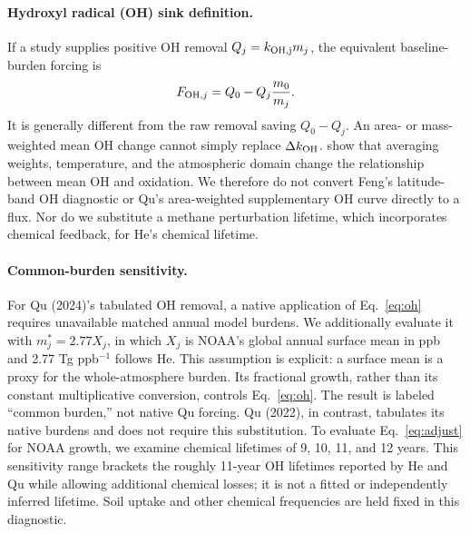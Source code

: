 \documentclass[11pt]{article}
\begin{document}
\paragraph{Hydroxyl radical (OH) sink definition.}
If a study supplies positive OH removal $Q_j=k_{\rm OH,j}m_j$, the equivalent
baseline-burden forcing is
\begin{equation}\label{eq:oh}
F_{{\rm OH},j}=Q_0-Q_j\frac{m_0}{m_j}.
\end{equation}
It is generally different from the raw removal saving $Q_0-Q_j$.
An area- or mass-weighted mean OH change cannot simply replace
$\Delta k_{\rm OH}$. \citet{lawrenceetal2001} show that averaging weights,
temperature, and the atmospheric domain change the relationship between mean
OH and oxidation. We therefore do not convert Feng's latitude-band OH
diagnostic or Qu's area-weighted supplementary OH curve directly to a flux.
Nor do we substitute a methane perturbation lifetime, which incorporates
chemical feedback, for He's chemical lifetime.

\paragraph{Common-burden sensitivity.}
For Qu (2024)'s tabulated OH removal, a native application of Eq.~\ref{eq:oh}
requires unavailable matched annual model burdens. We additionally evaluate
it with $m^*_j=2.77X_j$, in which $X_j$ is NOAA's global annual surface mean
in ppb and 2.77 Tg ppb$^{-1}$ follows He. This assumption is explicit: a
surface mean is a proxy for the whole-atmosphere burden. Its fractional
growth, rather than its constant multiplicative conversion, controls
Eq.~\ref{eq:oh}. The result is labeled ``common burden,'' not native Qu
forcing. Qu (2022), in contrast, tabulates its native burdens and does not
require this substitution. To evaluate Eq.~\ref{eq:adjust} for NOAA growth, we examine chemical
lifetimes of 9, 10, 11, and 12 years. This sensitivity range brackets the
roughly 11-year OH lifetimes reported by He and Qu while allowing additional
chemical losses; it is not a fitted or independently inferred lifetime.
Soil uptake and other chemical frequencies are held fixed in this diagnostic.
\end{document}
